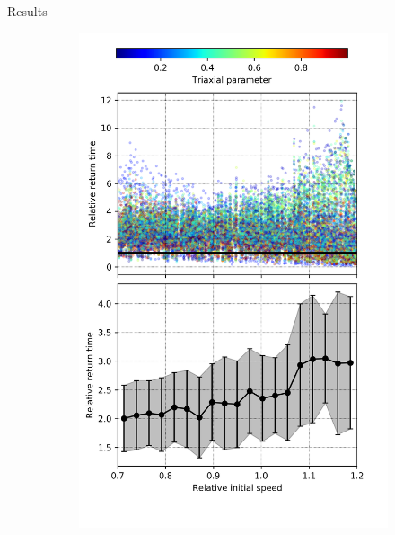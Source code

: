 \documentclass{beamer}
\begin{document}
\begin{frame}{Results}
	\begin{figure}[h]
		\centering
		\begin{subfigure}[b]{0.35\linewidth}
			\includegraphics[width = \linewidth]{"../Files/Week 14/relative_times"}
		\end{subfigure}
		~ 
		\begin{subfigure}[b]{0.35\linewidth}

\end{subfigure}
\end{figure}
\end{frame}
\end{document}
